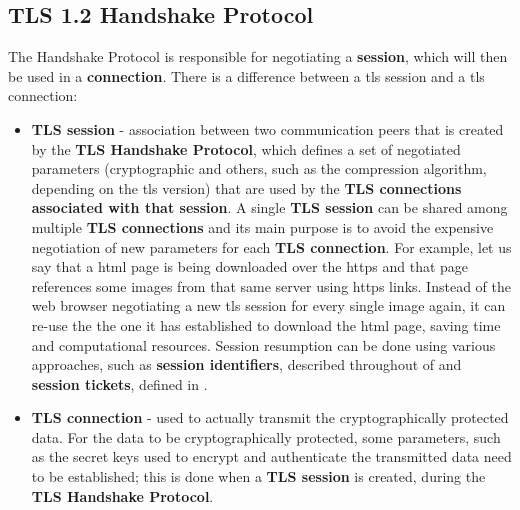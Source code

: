 \documentclass{llncs}
\begin{document}
{\subsection{TLS 1.2 Handshake Protocol} \label{hsp}

The Handshake Protocol is responsible for negotiating a \textbf{session},
which will then be used in a \textbf{connection}.
There is a difference between a \gls{tls} session and a \gls{tls} connection:
\begin{itemize}
  \item \textbf{TLS session} - association between two communication peers that is
  created by the \textbf{TLS Handshake Protocol}, which defines a set of negotiated parameters
  (cryptographic and others, such as
  the compression algorithm, depending on the \gls{tls} version) that are used by the \textbf{TLS connections associated
  with that session}. A single \textbf{TLS session} can be shared among multiple
  \textbf{TLS connections} and its main purpose is to avoid the expensive negotiation
  of new parameters for each \textbf{TLS connection}. For example, let us say
  that a \gls{html} page is being downloaded over the \gls{https} and that page references some images from that same server using \gls{https} links. Instead of the web browser negotiating a new \gls{tls} session for every single image again, it can re-use the the
  one it has established to download the \gls{html} page,
  saving time and computational resources. Session resumption can be done using various
  approaches, such as \textbf{session identifiers}, described throughout 
  of \cite{RFC5246} and \textbf{session tickets}, defined in
  \cite{RFC5077}.
  \item \textbf{TLS connection} - used to actually transmit the cryptographically
  protected data. For the data to be cryptographically protected, some parameters,
  such as the secret keys used to encrypt and authenticate the transmitted
  data need to be established; this is done when a \textbf{TLS session} is created,
  during the \textbf{TLS Handshake Protocol}.
\end{itemize}

}
\end{document}
